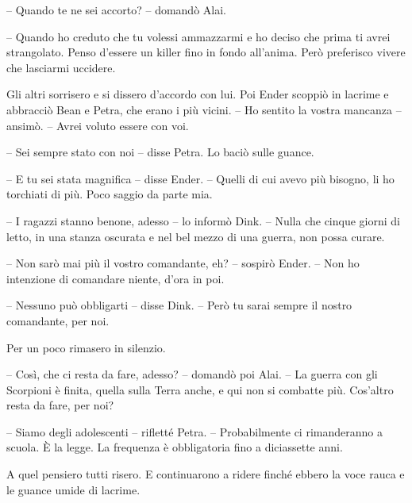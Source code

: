 {-- Quando te ne sei accorto? -- domandò Alai.}

{-- Quando ho creduto che tu volessi ammazzarmi e ho deciso che prima ti
	avrei strangolato. Penso d'essere un killer fino in fondo all'anima.
	Però preferisco vivere che lasciarmi uccidere.}

{Gli altri sorrisero e si dissero d'accordo con lui. Poi Ender scoppiò
	in lacrime e abbracciò Bean e Petra, che erano i più vicini. -- Ho
	sentito la vostra mancanza -- ansimò. -- Avrei voluto essere con voi.}

{-- Sei sempre stato con noi -- disse Petra. Lo baciò sulle guance.}

{-- E tu sei stata magnifica -- disse Ender. -- Quelli di cui avevo più
	bisogno, li ho torchiati di più. Poco saggio da parte mia.}

{-- I ragazzi stanno benone, adesso -- lo informò Dink. -- Nulla che
	cinque giorni di letto, in una stanza oscurata e nel bel mezzo di una
	guerra, non possa curare.}

{-- Non sarò mai più il vostro comandante, eh? -- sospirò Ender. -- Non
	ho intenzione di comandare niente, d'ora in poi.}

{-- Nessuno può obbligarti -- disse Dink. -- Però tu sarai sempre il
	nostro comandante, per noi.}

{Per un poco rimasero in silenzio.}

{-- Così, che ci resta da fare, adesso? -- domandò poi Alai. -- La
	guerra con gli Scorpioni è finita, quella sulla Terra anche, e qui non
	si combatte più. Cos'altro resta da fare, per noi?}

{-- Siamo degli adolescenti -- rifletté Petra. -- Probabilmente ci
	rimanderanno a scuola. È la legge. La frequenza è obbligatoria fino a
	diciassette anni.}

{A quel pensiero tutti risero. E continuarono a ridere finché ebbero la
	voce rauca e le guance umide di lacrime.}

\label{Orsonux20Scottux20Cardux20-ux20Ilux20Giocoux20Diux20Enderux20-ux20BY_SLY70A1_split_017.htm}{}
